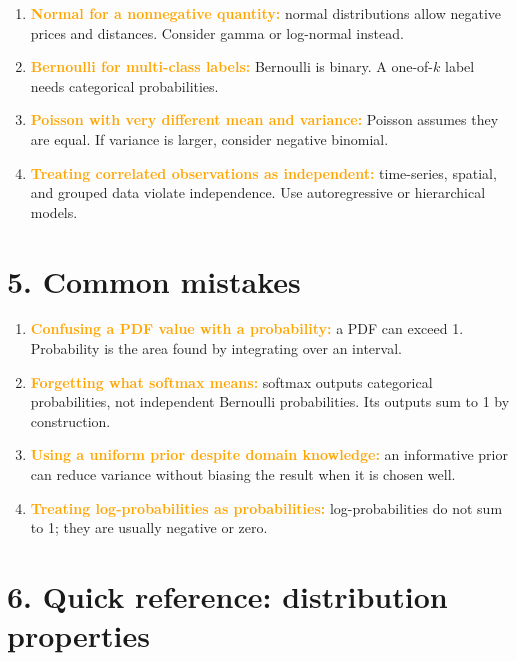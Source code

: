 \documentclass[11pt]{article}
\newcommand{\warning}[1]{\textcolor{orange}{\textbf{#1}}}
\begin{document}
\begin{enumerate}[leftmargin=18pt,itemsep=4pt]
  \item \warning{Normal for a nonnegative quantity:} normal distributions allow negative prices and distances. Consider gamma or log-normal instead.
  \item \warning{Bernoulli for multi-class labels:} Bernoulli is binary. A one-of-$k$ label needs categorical probabilities.
  \item \warning{Poisson with very different mean and variance:} Poisson assumes they are equal. If variance is larger, consider negative binomial.
  \item \warning{Treating correlated observations as independent:} time-series, spatial, and grouped data violate independence. Use autoregressive or hierarchical models.
\end{enumerate}

\section*{5. Common mistakes}

\begin{enumerate}[leftmargin=18pt,itemsep=4pt]
  \item \warning{Confusing a PDF value with a probability:} a PDF can exceed 1. Probability is the area found by integrating over an interval.
  \item \warning{Forgetting what softmax means:} softmax outputs categorical probabilities, not independent Bernoulli probabilities. Its outputs sum to 1 by construction.
  \item \warning{Using a uniform prior despite domain knowledge:} an informative prior can reduce variance without biasing the result when it is chosen well.
  \item \warning{Treating log-probabilities as probabilities:} log-probabilities do not sum to 1; they are usually negative or zero.
\end{enumerate}

\section*{6. Quick reference: distribution properties}
\end{document}
